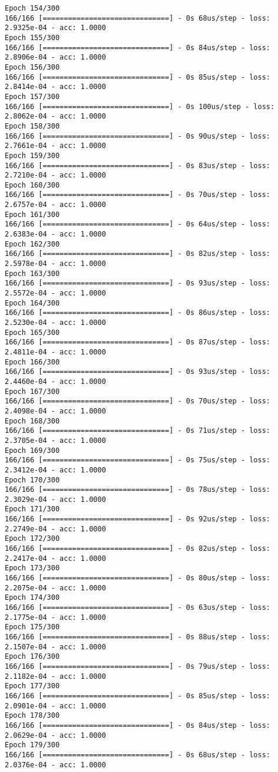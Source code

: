 \documentclass[11pt]{article}
\begin{document}
\begin{Verbatim}[commandchars=\\\{\}]
Epoch 154/300
166/166 [==============================] - 0s 68us/step - loss: 2.9325e-04 - acc: 1.0000
Epoch 155/300
166/166 [==============================] - 0s 84us/step - loss: 2.8906e-04 - acc: 1.0000
Epoch 156/300
166/166 [==============================] - 0s 85us/step - loss: 2.8414e-04 - acc: 1.0000
Epoch 157/300
166/166 [==============================] - 0s 100us/step - loss: 2.8062e-04 - acc: 1.0000
Epoch 158/300
166/166 [==============================] - 0s 90us/step - loss: 2.7661e-04 - acc: 1.0000
Epoch 159/300
166/166 [==============================] - 0s 83us/step - loss: 2.7210e-04 - acc: 1.0000
Epoch 160/300
166/166 [==============================] - 0s 70us/step - loss: 2.6757e-04 - acc: 1.0000
Epoch 161/300
166/166 [==============================] - 0s 64us/step - loss: 2.6383e-04 - acc: 1.0000
Epoch 162/300
166/166 [==============================] - 0s 82us/step - loss: 2.5978e-04 - acc: 1.0000
Epoch 163/300
166/166 [==============================] - 0s 93us/step - loss: 2.5572e-04 - acc: 1.0000
Epoch 164/300
166/166 [==============================] - 0s 86us/step - loss: 2.5230e-04 - acc: 1.0000
Epoch 165/300
166/166 [==============================] - 0s 87us/step - loss: 2.4811e-04 - acc: 1.0000
Epoch 166/300
166/166 [==============================] - 0s 93us/step - loss: 2.4460e-04 - acc: 1.0000
Epoch 167/300
166/166 [==============================] - 0s 70us/step - loss: 2.4098e-04 - acc: 1.0000
Epoch 168/300
166/166 [==============================] - 0s 71us/step - loss: 2.3705e-04 - acc: 1.0000
Epoch 169/300
166/166 [==============================] - 0s 75us/step - loss: 2.3412e-04 - acc: 1.0000
Epoch 170/300
166/166 [==============================] - 0s 78us/step - loss: 2.3029e-04 - acc: 1.0000
Epoch 171/300
166/166 [==============================] - 0s 92us/step - loss: 2.2749e-04 - acc: 1.0000
Epoch 172/300
166/166 [==============================] - 0s 82us/step - loss: 2.2417e-04 - acc: 1.0000
Epoch 173/300
166/166 [==============================] - 0s 80us/step - loss: 2.2075e-04 - acc: 1.0000
Epoch 174/300
166/166 [==============================] - 0s 63us/step - loss: 2.1775e-04 - acc: 1.0000
Epoch 175/300
166/166 [==============================] - 0s 88us/step - loss: 2.1507e-04 - acc: 1.0000
Epoch 176/300
166/166 [==============================] - 0s 79us/step - loss: 2.1182e-04 - acc: 1.0000
Epoch 177/300
166/166 [==============================] - 0s 85us/step - loss: 2.0901e-04 - acc: 1.0000
Epoch 178/300
166/166 [==============================] - 0s 84us/step - loss: 2.0629e-04 - acc: 1.0000
Epoch 179/300
166/166 [==============================] - 0s 68us/step - loss: 2.0376e-04 - acc: 1.0000

\end{Verbatim}
\end{document}

